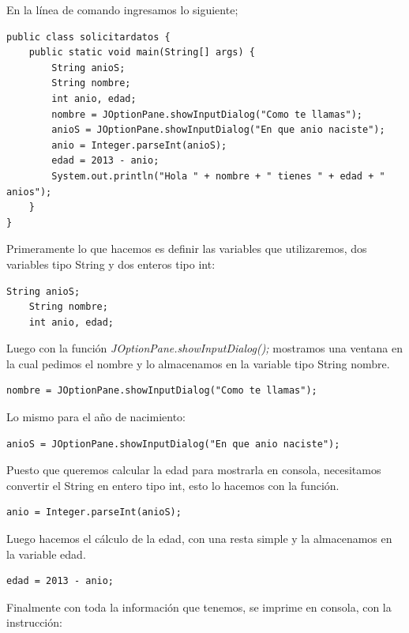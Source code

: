 \documentclass[12pt]{book} %
\begin{document}
En la línea de comando ingresamos lo siguiente;

\begin{lstlisting}[frame=single]
public class solicitardatos {
    public static void main(String[] args) {
        String anioS;
        String nombre;
        int anio, edad;
        nombre = JOptionPane.showInputDialog("Como te llamas");
        anioS = JOptionPane.showInputDialog("En que anio naciste");
        anio = Integer.parseInt(anioS);
        edad = 2013 - anio;
        System.out.println("Hola " + nombre + " tienes " + edad + " anios");
    }
}
\end{lstlisting}

Primeramente lo que hacemos es definir las variables que utilizaremos, dos variables tipo String y dos enteros tipo int:

\begin{lstlisting}[]
	String anioS;
	String nombre;
	int anio, edad; 
\end{lstlisting}
	
Luego con la función \textit{JOptionPane.showInputDialog();}  mostramos una ventana en la cual pedimos el nombre y lo almacenamos en la variable tipo String nombre.

\begin{lstlisting}[]
	nombre = JOptionPane.showInputDialog("Como te llamas");
\end{lstlisting}
	
Lo mismo para el año de nacimiento:

\begin{lstlisting}[]
	anioS = JOptionPane.showInputDialog("En que anio naciste");
\end{lstlisting}

Puesto que queremos calcular la edad para mostrarla en consola, necesitamos convertir el String en entero tipo int, esto lo hacemos con la función.
	
\begin{lstlisting}[]
	anio = Integer.parseInt(anioS);
\end{lstlisting}

Luego hacemos el cálculo de la edad, con una resta simple y la almacenamos en la variable edad.

\begin{lstlisting}[]
	edad = 2013 - anio;
\end{lstlisting}
	
Finalmente con toda la información que tenemos, se imprime en consola, con la instrucción: 
\end{document}
